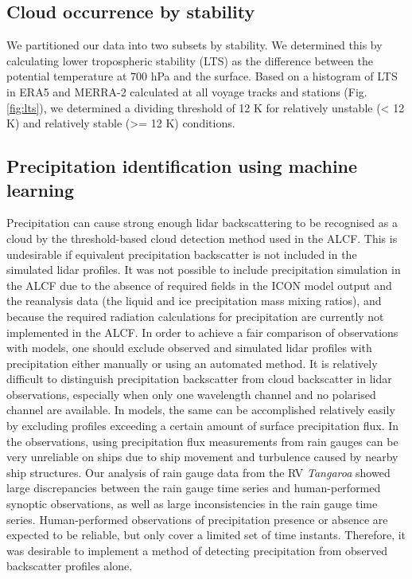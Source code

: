\documentclass[12pt,a4paper]{article}
\begin{document}
\subsection{Cloud occurrence by stability}

We partitioned our data into two subsets by stability. We determined this by
calculating lower tropospheric stability (LTS) as the difference between the
potential temperature at 700 hPa and the surface.  Based on a histogram of LTS
in ERA5 and MERRA-2 calculated at all voyage tracks and stations (Fig.
\ref{fig:lts}), we determined a dividing threshold of 12 K for relatively
unstable (< 12 K) and relatively stable (>= 12 K) conditions.

\subsection{Precipitation identification using machine learning}
\label{sec:ann}

Precipitation can cause strong enough lidar backscattering to be recognised as
a cloud by the threshold-based cloud detection method used in the ALCF. This is
undesirable if equivalent precipitation backscatter is not included in the
simulated lidar profiles. It was not possible to include precipitation
simulation in the ALCF due to the absence of required fields in the ICON model
output and the reanalysis data (the liquid and ice precipitation mass mixing
ratios), and because the required radiation calculations for precipitation are
currently not implemented in the ALCF. In order to achieve a fair comparison of
observations with models, one should exclude observed and simulated lidar
profiles with precipitation either manually or using an automated method. It is
relatively difficult to distinguish precipitation backscatter from cloud
backscatter in lidar observations, especially when only one wavelength channel
and no polarised channel are available. In models, the same can be accomplished
relatively easily by excluding profiles exceeding a certain amount of surface
precipitation flux. In the observations, using precipitation flux measurements
from rain gauges can be very unreliable on ships due to ship movement and
turbulence caused by nearby ship structures. Our analysis of rain gauge data
from the RV \emph{Tangaroa} showed large discrepancies between the rain gauge
time series and human-performed synoptic observations, as well as large
inconsistencies in the rain gauge time series. Human-performed observations of
precipitation presence or absence are expected to be reliable, but only cover a
limited set of time instants. Therefore, it was desirable to implement a method
of detecting precipitation from observed backscatter profiles alone.
\end{document}
